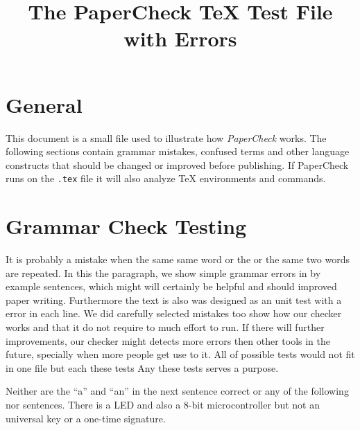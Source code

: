 \documentclass{scrartcl}
\title{The PaperCheck TeX Test File with Errors}
\begin{document}
\maketitle


\section{General}
This document is a small file used to illustrate how \emph{PaperCheck} works.
The following sections contain grammar mistakes, confused terms and other language constructs that should be changed or improved before publishing.
If PaperCheck runs on the \verb!.tex! file it will also analyze TeX environments and commands.



\section{Grammar Check Testing}
It is probably a mistake when the same same word   %
or the or the same two words are repeated.         %
In this the paragraph, we show simple grammar      %
errors in by example sentences, which              %
might will certainly be helpful                    %
and should improved paper writing.                 %
Furthermore the text                               %
is also was designed as                            %
an unit test with                                  %
a error in each line.                              %
We did carefully selected mistakes                 %
too show how our checker works                     %
and that it do not require                         %
to much effort to run.                             %
If there will further improvements,                %
our checker might detects more 
errors then other tools in 
the future, specially when more 
people get use to it.
All of possible tests would not fit
in one file but each these tests
Any these tests serves a purpose.


Neither are the “a” and “an” in the next sentence correct or any of the following nor sentences.
There is a LED and also a 8-bit microcontroller but not an universal key or a one-time signature.
\end{document}
